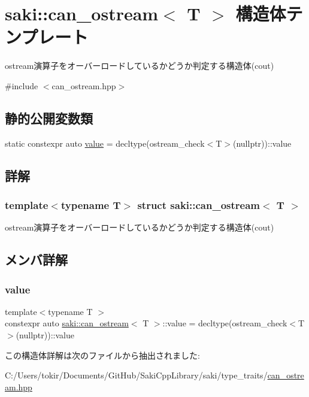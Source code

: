 \hypertarget{structsaki_1_1can__ostream}{}\section{saki\+:\+:can\+\_\+ostream$<$ T $>$ 構造体テンプレート}
\label{structsaki_1_1can__ostream}


ostream演算子をオーバーロードしているかどうか判定する構造体(cout)  




{\ttfamily \#include $<$can\+\_\+ostream.\+hpp$>$}

\subsection*{静的公開変数類}
\begin{DoxyCompactItemize}
\item 
static constexpr auto \mbox{\hyperlink{structsaki_1_1can__ostream_a949a7959b4856ff60149c82f2b1f56fd}{value}} = decltype(ostream\+\_\+check$<$T$>$(nullptr))\+::value
\end{DoxyCompactItemize}


\subsection{詳解}
\subsubsection*{template$<$typename T$>$\newline
struct saki\+::can\+\_\+ostream$<$ T $>$}

ostream演算子をオーバーロードしているかどうか判定する構造体(cout) 

\subsection{メンバ詳解}
\mbox{\label{structsaki_1_1can__ostream_a949a7959b4856ff60149c82f2b1f56fd}} 
\subsubsection{\texorpdfstring{value}{value}}
{\footnotesize\ttfamily template$<$typename T $>$ \\
constexpr auto \mbox{\hyperlink{structsaki_1_1can__ostream}{saki\+::can\+\_\+ostream}}$<$ T $>$\+::value = decltype(ostream\+\_\+check$<$T$>$(nullptr))\+::value\hspace{0.3cm}{\ttfamily [static]}}



この構造体詳解は次のファイルから抽出されました\+:\begin{DoxyCompactItemize}
\item 
C\+:/\+Users/tokir/\+Documents/\+Git\+Hub/\+Saki\+Cpp\+Library/saki/type\+\_\+traits/\mbox{\hyperlink{can__ostream_8hpp}{can\+\_\+ostream.\+hpp}}\end{DoxyCompactItemize}

